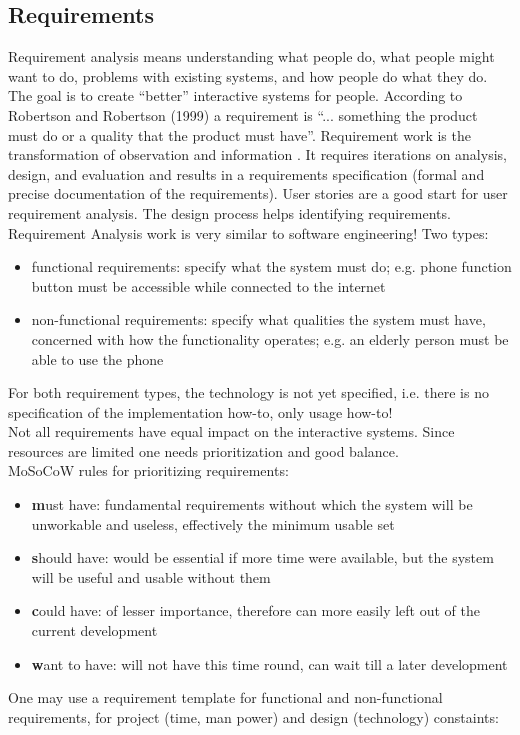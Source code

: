 \subsection{Requirements}
Requirement analysis means understanding what people do, what people might want to do, problems with existing systems, and how people do what they do. The goal is to create ``better'' interactive systems for people. According to Robertson and Robertson (1999) a requirement is ``... something the product must do or a quality that the product must have''. Requirement work is the transformation of observation and information . It requires iterations on analysis, design, and evaluation and results in a requirements specification (formal and precise documentation of the requirements). User stories are a good start for user requirement analysis. The design process helps identifying requirements. Requirement Analysis work is very similar to software engineering! Two types:
\begin{itemize}
\item functional requirements: specify what the system must do; e.g. phone function button must be accessible while connected to the internet
\item non-functional requirements: specify what qualities the system must have, concerned with how the functionality operates; e.g. an elderly person must be able to use the phone
\end{itemize} 
For both requirement types, the technology is not yet specified, i.e. there is no specification of the implementation how-to, only usage how-to!\\
Not all requirements have equal impact on the interactive systems. Since resources are limited one needs prioritization and good balance.\\
MoSoCoW rules for prioritizing requirements:
\begin{itemize}
\item \textbf{m}ust have: fundamental requirements without which the system will be unworkable and useless, effectively the minimum usable set
\item \textbf{s}hould have: would be essential if more time were available, but the system will be useful and usable without them
\item \textbf{c}ould have: of lesser importance, therefore can more easily left out of the current development
\item \textbf{w}ant to have: will not have this time round, can wait till a later development
\end{itemize}
One may use a requirement template for functional and non-functional requirements, for project (time, man power) and design (technology) constaints:

